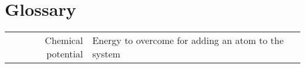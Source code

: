 \chapter*{Glossary} 

\begin{center}
\begin{longtable}{r p{}}
Chemical potential & Energy to overcome for adding an atom to the system
\end{longtable}
\end{center}
